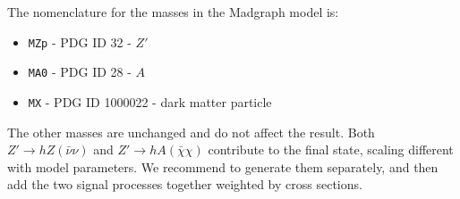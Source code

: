 The nomenclature for the masses in the Madgraph model is:
 \begin{itemize}
 	\item \texttt{MZp} - PDG ID 32 - $Z'$
 	\item \texttt{MA0} - PDG ID 28 - $A$
 	\item \texttt{MX} - PDG ID 1000022 - dark matter particle
 \end{itemize}
 
The other masses are unchanged and do not affect the result. 
 Both $Z' \to hZ(\bar \nu \nu)$ and  $Z' \to hA(\bar \chi \chi)$ contribute to the final state, scaling
 different with model parameters. We recommend to generate them separately, 
 and then add the two signal processes together weighted by cross sections.
 
